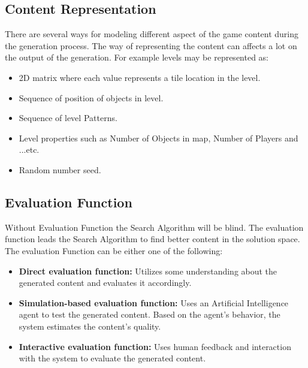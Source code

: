 \subsection{Content Representation}
There are several ways for modeling different aspect of the game content during the generation process. The way of representing the content can affects a lot on the output of the generation. For example levels may be represented as:\cite{pcgBookSearch}
\begin{itemize}\itemsep0pt \parskip0pt 
	\item 2D matrix where each value represents a tile location in the level.
	\item Sequence of position of objects in level.
	\item Sequence of level Patterns.
	\item Level properties such as Number of Objects in map, Number of Players and ...etc.
	\item Random number seed.
\end{itemize}

\subsection{Evaluation Function}
Without Evaluation Function the Search Algorithm will be blind. The evaluation function leads the Search Algorithm to find better content in the solution space. The evaluation Function can be either one of the following:\cite{pcgBookSearch}
\begin{itemize}\itemsep0pt \parskip0pt 
	\item \textbf{Direct evaluation function:} Utilizes some understanding about the generated content and evaluates it accordingly.
	\item \textbf{Simulation-based evaluation function:} Uses an Artificial Intelligence agent to test the generated content. Based on the agent's behavior, the system estimates the content's quality.
	\item \textbf{Interactive evaluation function:} Uses human feedback and interaction with the system to evaluate the generated content.
\end{itemize}

